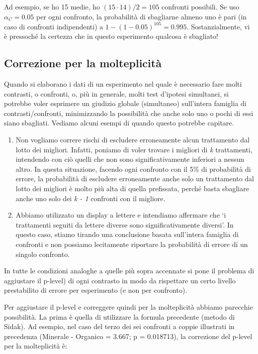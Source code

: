 \documentclass[a4paper,12pt,oneside]{book}
\providecommand{\tightlist}{%
  \setlength{\itemsep}{0pt}\setlength{\parskip}{0pt}}
\theoremstyle{definition}
\theoremstyle{definition}
\theoremstyle{definition}
\theoremstyle{remark}
\begin{document}
Ad esempio, se ho 15 medie, ho \((15 \cdot 14)/2 = 105\) confronti
possibili. Se uso \(\alpha_C = 0.05\) per ogni confronto, la probabilità
di sbagliarne almeno uno è pari (in caso di confronti indipendenti) a
\(1 - (1 - 0.05)^105 = 0.995\). Sostanzialmente, vi è pressoché la
certezza che in questo esperimento qualcosa è sbagliato!

\subsection{Correzione per la
molteplicità}\label{correzione-per-la-molteplicita}

Quando si elaborano i dati di un esperimento nel quale è necessario fare
molti contrasti, o confronti, o, più in generale, molti test d'ipotesi
simultanei, si potrebbe voler esprimere un giudizio globale (simultaneo)
sull'intera famiglia di contrasti/confronti, minimizzando la possibilità
che anche solo uno o pochi di essi siano sbagliati. Vediamo alcuni
esempi di quando questo potrebbe capitare.

\begin{enumerate}
\def\labelenumi{\arabic{enumi}.}
\tightlist
\item
  Non vogliamo correre rischi di escludere erroneamente alcun
  trattamento dal lotto dei migliori. Infatti, poniamo di voler trovare
  i migliori di \emph{k} trattamenti, intendendo con ciò quelli che non
  sono significativamente inferiori a nessun altro. In questa
  situazione, facendo ogni confronto con il 5\% di probabilità di
  errore, la probabilità di escludere erroneamente anche solo un
  trattamento dal lotto dei migliori è molto più alta di quella
  prefissata, perché basta sbagliare anche uno solo dei \emph{k - 1}
  confronti con il migliore.
\item
  Abbiamo utilizzato un display a lettere e intendiamo affermare che `i
  trattamenti seguiti da lettere diverse sono significativamente
  diversi'. In questo caso, stiamo tirando una conclusione basata
  sull'intera famiglia di confronti e non possiamo lecitamente riportare
  la probabilità di errore di un singolo confronto.
\end{enumerate}

In tutte le condizioni analoghe a quelle più sopra accennate si pone il
problema di aggiustare il p-level) di ogni contrasto in modo da
rispettare un certo livello prestabilito di errore per esperimento (e
non per confronto).

Per aggiustare il p-level e correggere quindi per la molteplicità
abbiamo parecchie possibilità. La prima è quella di utilizzare la
formula precedente (metodo di Sidak). Ad esempio, nel caso del terzo dei
sei confronti a coppie illustrati in precedenza (Minerale - Organico =
3.667; p = 0.018713), la correzione del p-level per la molteplicità è:
\end{document}
